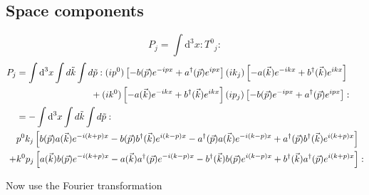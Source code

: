 \subsection*{Space components}
\newcommand{\spacc}{\hphantom{\int \text{d}^3x \int d\tilde{k} \int d\tilde{k} :}}
\begin{equation}
         P_j = \int \text{d}^3x :{T^0}_j:
\end{equation}
\begin{align}
      P_j  &= 
        \int \text{d}^3x \int d\tilde{k} \int d\tilde{p} :
            (i p^0) \left[-b(\vec{p})e^{-i p x} + a^{\dagger}(\vec{p})e^{i p x}\right]  
            (i k_j) \left[-a(\vec{k})e^{-i k x} + b^{\dagger}(\vec{k})e^{i k x}\right]  \\
       & \spacc +  (i k^0) \left[-a(\vec{k})e^{-i k x} + b^{\dagger}(\vec{k})e^{i k x}\right]
        (i p_j) \left[-b(\vec{p})e^{-i p x} + a^{\dagger}(\vec{p})e^{i p x}\right]
        :\\
        &= -
        \int \text{d}^3x \int d\tilde{k} \int d\tilde{p} :\\
        &p^0 k_j \left[ b(\vec{p}) a(\vec{k}) e^{-i (k+p) x}  
                      - b(\vec{p}) b^{\dagger}(\vec{k}) e^{i (k-p) x} 
                      - a^\dagger(\vec{p}) a(\vec{k}) e^{-i(k-p) x}
                      + a^\dagger(\vec{p}) b^\dagger(\vec{k}) e^{i(k+p) x}
                      \right]\\
         +& k^0 p_j \left[ a(\vec{k}) b(\vec{p}) e^{-i (k+p) x} 
                        - a(\vec{k}) a^{\dagger}(\vec{p}) e^{-i (k-p) x} 
                        - b^\dagger(\vec{k}) b(\vec{p}) e^{i(k-p) x}
                      + b^\dagger(\vec{k}) a^\dagger(\vec{p}) e^{i(k+p) x}
                   \right]:
\end{align}

Now use the Fourier transformation

